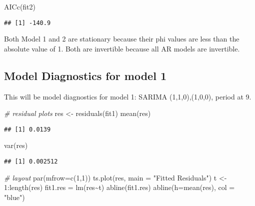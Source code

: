 \documentclass[
]{article}
\newenvironment{Shaded}{\begin{snugshade}}{\end{snugshade}}
\newcommand{\AttributeTok}[1]{\textcolor[rgb]{0.77,0.63,0.00}{#1}}
\newcommand{\CommentTok}[1]{\textcolor[rgb]{0.56,0.35,0.01}{\textit{#1}}}
\newcommand{\DecValTok}[1]{\textcolor[rgb]{0.00,0.00,0.81}{#1}}
\newcommand{\FunctionTok}[1]{\textcolor[rgb]{0.00,0.00,0.00}{#1}}
\newcommand{\NormalTok}[1]{#1}
\newcommand{\OtherTok}[1]{\textcolor[rgb]{0.56,0.35,0.01}{#1}}
\newcommand{\SpecialCharTok}[1]{\textcolor[rgb]{0.00,0.00,0.00}{#1}}
\newcommand{\StringTok}[1]{\textcolor[rgb]{0.31,0.60,0.02}{#1}}
\begin{document}
\begin{Shaded}
\begin{Highlighting}[]
\FunctionTok{AICc}\NormalTok{(fit2)}
\end{Highlighting}
\end{Shaded}

\begin{verbatim}
## [1] -140.9
\end{verbatim}

Both Model 1 and 2 are stationary because their phi values are less than
the absolute value of 1. Both are invertible because all AR models are
invertible.

\hypertarget{model-diagnostics-for-model-1}{%
\subsection{Model Diagnostics for model
1}\label{model-diagnostics-for-model-1}}

This will be model diagnostics for model 1: SARIMA (1,1,0),(1,0,0),
period at 9.

\begin{Shaded}
\begin{Highlighting}[]
\CommentTok{\# residual plots}
\NormalTok{res }\OtherTok{\textless{}{-}} \FunctionTok{residuals}\NormalTok{(fit1)}
\FunctionTok{mean}\NormalTok{(res)}
\end{Highlighting}
\end{Shaded}

\begin{verbatim}
## [1] 0.0139
\end{verbatim}

\begin{Shaded}
\begin{Highlighting}[]
\FunctionTok{var}\NormalTok{(res)}
\end{Highlighting}
\end{Shaded}

\begin{verbatim}
## [1] 0.002512
\end{verbatim}

\begin{Shaded}
\begin{Highlighting}[]
\CommentTok{\# layout}
\FunctionTok{par}\NormalTok{(}\AttributeTok{mfrow=}\FunctionTok{c}\NormalTok{(}\DecValTok{1}\NormalTok{,}\DecValTok{1}\NormalTok{))}
\FunctionTok{ts.plot}\NormalTok{(res, }\AttributeTok{main  =} \StringTok{"Fitted Residuals"}\NormalTok{)}
\NormalTok{t }\OtherTok{\textless{}{-}} \DecValTok{1}\SpecialCharTok{:}\FunctionTok{length}\NormalTok{(res)}
\NormalTok{fit1.res }\OtherTok{=} \FunctionTok{lm}\NormalTok{(res}\SpecialCharTok{\textasciitilde{}}\NormalTok{t)}
\FunctionTok{abline}\NormalTok{(fit1.res)}
\FunctionTok{abline}\NormalTok{(}\AttributeTok{h=}\FunctionTok{mean}\NormalTok{(res), }\AttributeTok{col =} \StringTok{"blue"}\NormalTok{)}
\end{Highlighting}
\end{Shaded}
\end{document}
